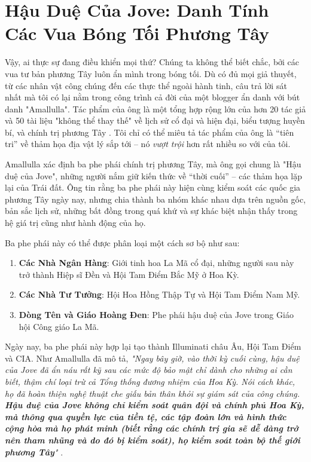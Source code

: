 \documentclass[10pt,twocolumn,letterpaper]{article}
\begin{document}
\section{Hậu Duệ Của Jove: Danh Tính Các Vua Bóng Tối Phương Tây}

Vậy, ai thực sự đang điều khiển mọi thứ? Chúng ta không thể biết chắc, bởi các vua tư bản phương Tây luôn ẩn mình trong bóng tối. Dù có đủ mọi giả thuyết, từ các nhân vật công chúng đến các thực thể ngoài hành tinh, câu trả lời sát nhất mà tôi có lại nằm trong công trình cả đời của một blogger ẩn danh với bút danh "Amallulla". Tác phẩm của ông là một tổng hợp rộng lớn của hơn 20 tác giả và 50 tài liệu "không thể thay thế" về lịch sử cổ đại và hiện đại, biểu tượng huyền bí, và chính trị phương Tây \cite{33,34}. Tôi chỉ có thể miêu tả tác phẩm của ông là “tiên tri” về thảm họa địa vật lý sắp tới – nó \textit{vượt trội} hơn rất nhiều so với của tôi.

Amallulla xác định ba phe phái chính trị phương Tây, mà ông gọi chung là "Hậu duệ của Jove", những người nắm giữ kiến thức về “thời cuối” – các thảm họa lặp lại của Trái đất. Ông tin rằng ba phe phái này hiện cùng kiểm soát các quốc gia phương Tây ngày nay, nhưng chia thành ba nhóm khác nhau dựa trên nguồn gốc, bản sắc lịch sử, những bất đồng trong quá khứ và sự khác biệt nhận thấy trong hệ giá trị cũng như hành động của họ.

Ba phe phái này có thể được phân loại một cách sơ bộ như sau:

\begin{flushleft}
\begin{enumerate}
    \item \textbf{Các Nhà Ngân Hàng}: Giới tinh hoa La Mã cổ đại, những người sau này trở thành Hiệp sĩ Đền và Hội Tam Điểm Bắc Mỹ ở Hoa Kỳ.
    \item \textbf{Các Nhà Tư Tưởng}: Hội Hoa Hồng Thập Tự và Hội Tam Điểm Nam Mỹ.
    \item \textbf{Dòng Tên và Giáo Hoàng Đen}: Phe phái hậu duệ của Jove trong Giáo hội Công giáo La Mã.
\end{enumerate}
\end{flushleft}

Ngày nay, ba phe phái này hợp lại tạo thành Illuminati châu Âu, Hội Tam Điểm và CIA. Như Amallulla đã mô tả, \textit{"Ngay bây giờ, vào thời kỳ cuối cùng, hậu duệ của Jove đã ẩn náu rất kỹ sau các mức độ bảo mật chỉ dành cho những ai cần biết, thậm chí loại trừ cả Tổng thống đương nhiệm của Hoa Kỳ. Nói cách khác, họ đã hoàn thiện nghệ thuật che giấu bản thân khỏi sự giám sát của công chúng. \textbf{Hậu duệ của Jove không chỉ kiểm soát quân đội và chính phủ Hoa Kỳ, mà thông qua quyền lực của tiền tệ, các tập đoàn lớn và hình thức cộng hòa mà họ phát minh (biết rằng các chính trị gia sẽ dễ dàng trở nên tham nhũng và do đó bị kiểm soát), họ kiểm soát toàn bộ thế giới phương Tây}"} \cite{33,34}.
\end{document}
